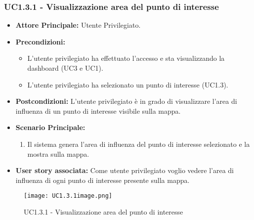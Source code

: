 \documentclass[11pt]{article}
\begin{document}
\begin{justify}
\subsubsection{\textbf{UC1.3.1 - Visualizzazione area del punto di interesse}}
\begin{itemize}
     \item \textbf{Attore Principale:} Utente Privilegiato.
     \item \textbf{Precondizioni:}
        \begin{itemize}
            \item L'utente privilegiato ha effettuato l'accesso e sta visualizzando la dashboard (UC3 e UC1).
            \item L'utente privilegiato ha selezionato un punto di interesse (UC1.3).
        \end{itemize}
     \item \textbf{Postcondizioni:} L'utente privilegiato è in grado di visualizzare l'area di influenza di un punto di interesse visibile sulla mappa.
     \item \textbf{Scenario Principale:}
        \begin{enumerate}
            \item Il sistema genera l'area di influenza del punto di interesse selezionato e la mostra sulla mappa.
        \end{enumerate}
     \item \textbf{User story associata:}
     Come utente privilegiato voglio vedere l'area di influenza di ogni punto di interesse presente sulla mappa.
\end{itemize}
\begin{figure}[ht]
    \centering
    \texttt{[image: UC1.3.1image.png]}
    \caption{UC1.3.1 - Visualizzazione area del punto di interesse}
    \label{fig:UC1.3.1}
\end{figure}

\end{justify}
\end{document}
